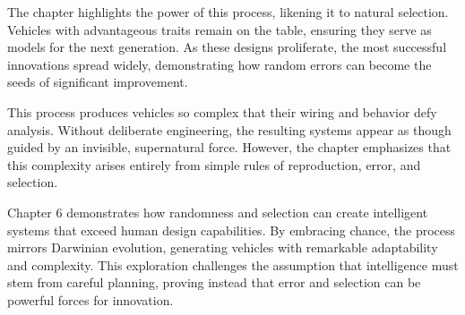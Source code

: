 \documentclass{article}
\begin{document}
    The chapter highlights the power of this process, likening it to natural selection. Vehicles with advantageous traits remain on the table, ensuring they serve as models for the next generation. As these designs proliferate, the most successful innovations spread widely, demonstrating how random errors can become the seeds of significant improvement.  

    This process produces vehicles so complex that their wiring and behavior defy analysis. Without deliberate engineering, the resulting systems appear as though guided by an invisible, supernatural force. However, the chapter emphasizes that this complexity arises entirely from simple rules of reproduction, error, and selection.  

    Chapter 6 demonstrates how randomness and selection can create intelligent systems that exceed human design capabilities. By embracing chance, the process mirrors Darwinian evolution, generating vehicles with remarkable adaptability and complexity. This exploration challenges the assumption that intelligence must stem from careful planning, proving instead that error and selection can be powerful forces for innovation.  
\end{document}
